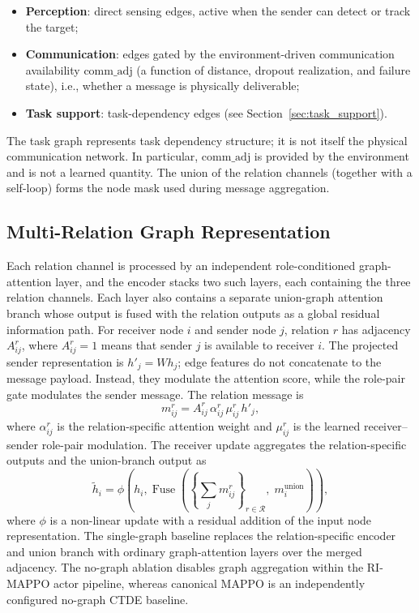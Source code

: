 \begin{itemize}
    \item \textbf{Perception}: direct sensing edges, active when the sender can detect or track the target;
    \item \textbf{Communication}: edges gated by the environment-driven communication availability $\mathrm{comm\_adj}$ (a function of distance, dropout realization, and failure state), i.e., whether a message is physically deliverable;
    \item \textbf{Task support}: task-dependency edges (see Section~\ref{sec:task_support}).
\end{itemize}

The task graph represents task dependency structure; it is not itself the physical communication network. In particular, $\mathrm{comm\_adj}$ is provided by the environment and is not a learned quantity. The union of the relation channels (together with a self-loop) forms the node mask used during message aggregation.

\subsection{Multi-Relation Graph Representation}
\label{sec:graph_rep}

Each relation channel is processed by an independent role-conditioned graph-attention layer, and the encoder stacks two such layers, each containing the three relation channels. Each layer also contains a separate union-graph attention branch whose output is fused with the relation outputs as a global residual information path. For receiver node $i$ and sender node $j$, relation $r$ has adjacency $A^r_{ij}$, where $A^r_{ij}=1$ means that sender $j$ is available to receiver $i$. The projected sender representation is $h'_j=W h_j$; edge features do not concatenate to the message payload. Instead, they modulate the attention score, while the role-pair gate modulates the sender message. The relation message is
\begin{equation}
    m^r_{ij} = A^r_{ij}\,\alpha^r_{ij}\,\mu^r_{ij}\,h'_j,
\label{eq:message}
\end{equation}
where $\alpha^r_{ij}$ is the relation-specific attention weight and $\mu^r_{ij}$ is the learned receiver--sender role-pair modulation. The receiver update aggregates the relation-specific outputs and the union-branch output as
\begin{equation}
    \tilde{h}_i = \phi\left(h_i, \operatorname{Fuse}\left(\left\{\sum_j m^r_{ij}\right\}_{r\in\mathcal{R}},\;m^{\mathrm{union}}_i\right)\right),
\label{eq:aggregate}
\end{equation}
where $\phi$ is a non-linear update with a residual addition of the input node representation. The single-graph baseline replaces the relation-specific encoder and union branch with ordinary graph-attention layers over the merged adjacency. The no-graph ablation disables graph aggregation within the RI-MAPPO actor pipeline, whereas canonical MAPPO is an independently configured no-graph CTDE baseline.

